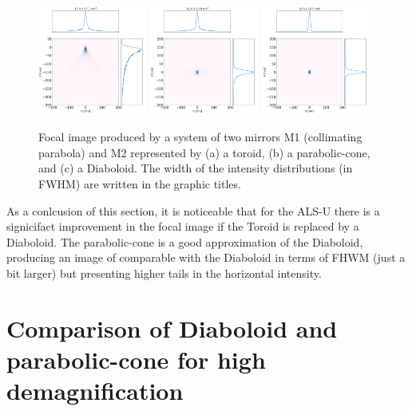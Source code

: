 \documentclass[a4paper, 11pt]{article}
\begin{document}
\begin{figure}[h]
\includegraphics[width=0.32\textwidth]{figures/alsu_toroid.png}
\includegraphics[width=0.32\textwidth]{figures/alsu_parabolic-cone.png}
\includegraphics[width=0.32\textwidth]{figures/alsu_diaboloid.png}
\caption{\label{fig:als}Focal image produced by a system of two mirrors M1 (collimating parabola) and M2 represented by (a) a toroid, (b) a parabolic-cone, and (c) a Diaboloid. The width of the intensity distributions (in FWHM) are written in the graphic titles. 
}
\end{figure}

As a conlcusion of this section, it is noticeable that for the ALS-U there is a signicifact improvement in the focal image if the Toroid is replaced by a Diaboloid. The parabolic-cone is a good approximation of the Diaboloid, producing an image of comparable with the Diaboloid in terms of FHWM (just a bit larger) but presenting higher tails in the horizontal intensity. 

\section{Comparison of Diaboloid and parabolic-cone for high demagnification}
\end{document}
